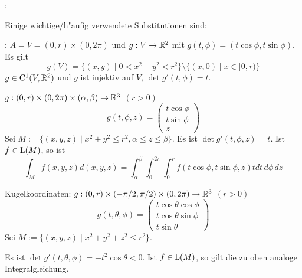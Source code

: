 \example:{
  Einige wichtige/h"aufig verwendete Substitutionen sind:
  \begin{stmts}
    \item {}: 
      $A=V=(0,r)\times (0,2\pi)$ und $g:V\to\mathbb R^2$
      mit $g(t,\phi)=(t \cos \phi, t\sin \phi)$. Es gilt
      \[g(V)=\{(x,y)\mid 0<x^2+y^2<r^2\}\setminus\{(x,0)\mid x\in[0,r)\}
        \]
      $g\in{\rm C}^1(V,\mathbb R^2)$ und $g$ ist injektiv auf $V$, 
      $\det g'(t,\phi)=t$.
    \item {} 
      $g:(0,r)\times(0,2\pi)\times(\alpha,\beta)\to\mathbb R^3$ $(r>0)$
      \[g(t,\phi,z)=\begin{pmatrix}
	  t\cos \phi \\
	  t\sin \phi \\
	  z
	  \end{pmatrix}
        \]
      Sei $M:=\{(x,y,z)\mid x^2+y^2\le r^2, \alpha\le z \le\beta \}$.
      Es ist $\det g'(t,\phi,z)=t$.
      Ist $f\in{\rm L}(M)$, so ist
      \[\int_M f(x,y,z) d(x,y,z)=
	\int_\alpha^\beta \int_0^{2\pi} \int_0^r f(t\cos \phi, t\sin\phi,z) t 
	  dt\, d\phi\, dz
        \]
    \item Kugelkoordinaten: $g:(0,r)\times(-\pi/2,\pi/2)\times(0,2\pi)\to\mathbb R^3$ 
      $(r>0)$
      \[g(t,\theta,\phi)=\begin{pmatrix}
	  t\cos\theta \cos \phi \\
	  t\cos\theta \sin \phi \\
	  t\sin\theta
	  \end{pmatrix}
        \]
      Sei $M:=\{(x,y,z)\mid x^2+y^2+z^2\le r^2 \}$.
      
      Es ist $\det g'(t,\theta,\phi)=-t^2 \cos \theta <0$.
      Ist $f\in{\rm L}(M)$, so gilt die zu oben analoge Integralgleichung.
    \end{stmts}
  }
